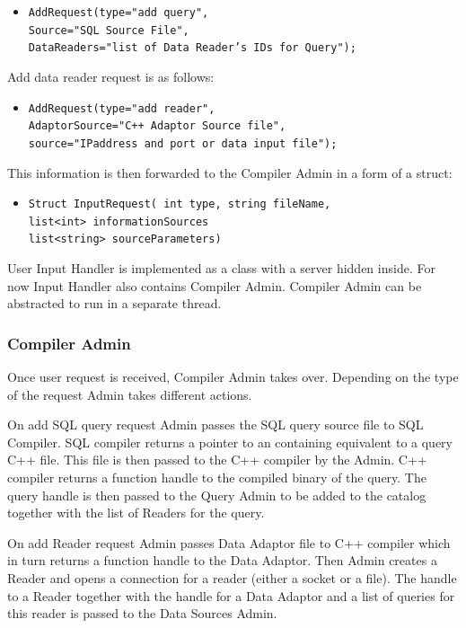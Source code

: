 \documentclass[11pt]{article}
\begin{document}
\begin{itemize}
	\item {\tt AddRequest(type="add query",\\
		 Source="SQL Source File",\\
	     DataReaders="list of Data Reader's IDs for Query");}
\end{itemize}

\noindent Add data reader request is as follows:

\begin{itemize}
	\item {\tt AddRequest(type="add reader", \\
	     AdaptorSource="C++ Adaptor Source file",\\
	     source="IPaddress and port or data input file");}
\end{itemize}

This information is then forwarded to the Compiler Admin in a form of a struct:

\begin{itemize}
	\item {\tt Struct InputRequest( int type, string fileName,\\
	       list<int> informationSources \\
		   list<string> sourceParameters)}
\end{itemize}

User Input Handler is implemented as a class with a server hidden inside. For now Input Handler also contains Compiler Admin. Compiler Admin can be abstracted to run in a separate thread. 

\subsubsection{Compiler Admin}

Once user request is received, Compiler Admin takes over. Depending on the type of the request Admin takes different actions. 

On add SQL query request Admin passes the SQL query source file to SQL Compiler. SQL compiler returns a pointer to an containing equivalent to a query C++ file. This file is then passed to the C++ compiler by the Admin. C++ compiler returns a function handle to the compiled binary of the query. The query handle is then passed to the Query Admin to be added to the catalog together with the list of Readers for the query.

On add Reader request Admin passes Data Adaptor file to C++ compiler which in turn returns a function handle to the Data Adaptor. Then Admin creates a Reader and opens a connection for a reader (either a socket or a file). The handle to a Reader together with the handle for a Data Adaptor and a list of queries for this reader is passed to the Data Sources Admin. 
\end{document}
